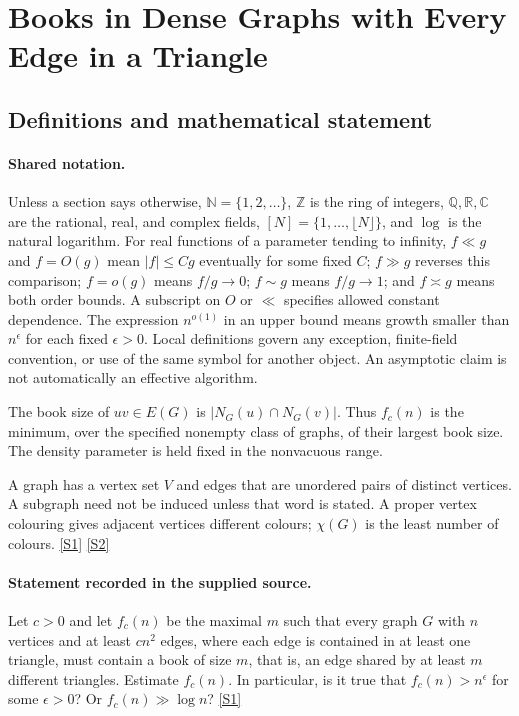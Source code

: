 \documentclass[11pt,a4paper]{article}
\newcommand{\N}{\mathbb{N}}
\newcommand{\Z}{\mathbb{Z}}
\newcommand{\Q}{\mathbb{Q}}
\newcommand{\R}{\mathbb{R}}
\newcommand{\C}{\mathbb{C}}
\newcommand{\sref}[2]{\hyperlink{source:#1:#2}{[S#2]}}
\begin{document}
\section{Books in Dense Graphs with Every Edge in a Triangle}\label{statement}


\subsection{Definitions and mathematical statement}

\paragraph{Shared notation.}Unless a section says otherwise, $\N=\{1,2,\ldots\}$,
$\Z$ is the ring of integers, $\Q,\R,\C$ are the rational, real, and complex
fields, $[N]=\{1,\ldots,\lfloor N\rfloor\}$, and $\log$ is the natural
logarithm. For real functions of a parameter tending to infinity,
$f\ll g$ and $f=O(g)$ mean $|f|\leq Cg$ eventually for some fixed $C$;
$f\gg g$ reverses this comparison; $f=o(g)$ means $f/g\to0$;
$f\sim g$ means $f/g\to1$; and $f\asymp g$ means both order bounds.
A subscript on $O$ or $\ll$ specifies allowed constant dependence.
The expression $n^{o(1)}$ in an upper bound means growth smaller than
$n^\epsilon$ for each fixed $\epsilon>0$. Local definitions govern any
exception, finite-field convention, or use of the same symbol for another
object. An asymptotic claim is not automatically an effective algorithm.



The book size of $uv\in E(G)$ is $|N_G(u)\cap N_G(v)|$. Thus $f_c(n)$ is the minimum, over the specified nonempty class of graphs, of their largest book size. The density parameter is held fixed in the nonvacuous range.

A graph has a vertex set $V$ and edges that are unordered pairs of distinct vertices. A subgraph need not be induced unless that word is stated. A proper vertex colouring gives adjacent vertices different colours; $\chi(G)$ is the least number of colours. \sref{statement}{1} \sref{statement}{2}

\paragraph{Statement recorded in the supplied source.}
Let $c>0$ and let $f_c(n)$ be the maximal $m$ such that every graph $G$ with $n$ vertices and at least $cn^2$ edges, where each edge is contained in at least one triangle, must contain a book of size $m$, that is, an edge shared by at least $m$ different triangles.
Estimate $f_c(n)$. In particular, is it true that $f_c(n)>n^{\epsilon}$ for some $\epsilon>0$? Or $f_c(n)\gg \log n$? \sref{statement}{1}
\end{document}
